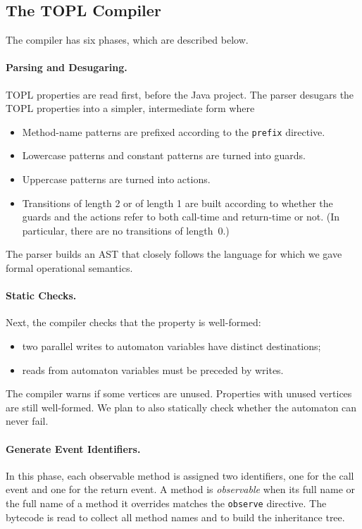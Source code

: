 \documentclass[10pt, preprint]{sigplanconf} %
\begin{document}
\subsection{The TOPL Compiler} \label{sec:toplc} %

The compiler has six phases, which are described below.

\paragraph{Parsing and Desugaring.}
TOPL properties are read first, before the Java project.
The parser desugars the TOPL properties into a simpler, intermediate form where
\begin{itemize}
\item Method-name patterns are prefixed according to the {\tt prefix} directive.
\item Lowercase patterns and constant patterns are turned into guards.
\item Uppercase patterns are turned into actions.
\item Transitions of length 2 or of length 1 are built according to whether the guards and the actions refer to both call-time and return-time or not. (In particular, there are no transitions of length~$0$.)
\end{itemize}
The parser builds an AST that closely follows the language for which we gave formal operational semantics.

\paragraph{Static Checks.}
Next, the compiler checks that the property is well-formed:
\begin{itemize}
\item two parallel writes to automaton variables have distinct destinations;
\item reads from automaton variables must be preceded by writes.
\end{itemize}

The compiler warns if some vertices are unused.
Properties with unused vertices are still well-formed.
We plan to also statically check whether the automaton can never fail.

\paragraph{Generate Event Identifiers.}

In this phase, each observable method is assigned two identifiers, one for the call event and one for the return event.
A method is \emph{observable} when its full name or the full name of a method it overrides matches the {\tt observe} directive.
The bytecode is read to collect all method names and to build the inheritance tree.
\end{document}
